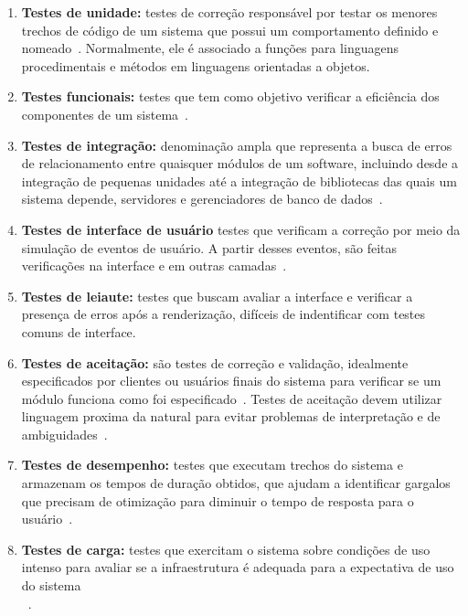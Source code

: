 \begin{enumerate}

\item \textbf{Testes de unidade:} testes de correção responsável por testar os 
menores trechos de código de um sistema que possui um comportamento definido e 
nomeado~\cite{bernardo2011}.
%
Normalmente, ele é associado a funções para linguagens procedimentais e métodos em 
linguagens orientadas a objetos.

\item \textbf{Testes funcionais:} testes que tem como objetivo verificar a eficiência
dos componentes de um sistema~\cite{molinari2003}.

\item \textbf{Testes de integração:} denominação ampla que representa a busca de 
erros de relacionamento entre quaisquer módulos de um software, incluindo desde 
a integração de pequenas unidades até a integração de bibliotecas das quais um 
sistema depende, servidores e gerenciadores de banco de dados~\cite{bernardo2011}.

\item \textbf{Testes de interface de usuário} testes que verificam a correção 
por meio da simulação de eventos de usuário. A partir desses eventos, são feitas 
verificações na interface e em outras camadas~\cite{bernardo2011}.

\item \textbf{Testes de leiaute:} testes que buscam avaliar a interface 
e verificar a presença de erros após a renderização, difíceis de indentificar 
com testes comuns de interface.

\item \textbf{Testes de aceitação:} são testes de correção e validação, idealmente 
especificados por clientes ou usuários finais do sistema para verificar se um 
módulo funciona como foi especificado~\cite{martin2005}.
%
Testes de aceitação devem utilizar linguagem proxima da natural para evitar 
problemas de interpretação e de ambiguidades~\cite{cunningham2005}.

\item \textbf{Testes de desempenho:} testes que executam trechos do sistema e 
armazenam os tempos de duração obtidos, que ajudam a identificar gargalos que 
precisam de otimização para diminuir o tempo de resposta  para o usuário~\cite{liu2009}.

\item \textbf{Testes de carga:}  testes que exercitam o sistema sobre condições de uso 
intenso para avaliar se a infraestrutura é adequada para a expectativa de uso do 
sistema\\~\cite{avritze1994}.


\end{enumerate}
